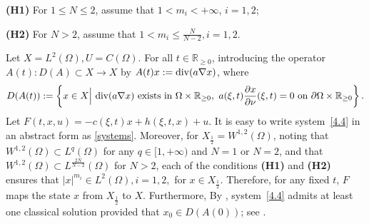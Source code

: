 \documentclass[onecolumn]{autart}
\newenvironment{proof of Prop.ODE}{{\it Proof of Proposition~\ref{Prop.ODE}:\enspace}}{\hfill $\blacksquare$\par}
\newenvironment{proof of PDE}{{\it Proof of Proposition \ref{Prop.8}:\enspace}}{\hfill $\blacksquare$\par}
\newtheorem{assumption}{Assumption}
\begin{document}
{%
\textbf{(H1)} For $1\leq N\leq 2$,  assume that $1<m_i<+\infty $,  $i=1,2$;

\textbf{(H2)} For $N>2$, assume that $ {1<m_i\leq \frac{N}{N-2}}, i=1, 2$.

Let $ X =L^{2}(\Omega),  U=C(\Omega)$. For all $t\in\mathbb{R}_{\geq 0}$, introducing the operator $A(t):D(A)\subset X \rightarrow X $ by $A(t)x:=  {\rm div}(a\nabla x)$, where
\begin{align*}
	D(A(t)):=\left\{x\in  X \Big|~{\rm div}(a\nabla x)\  \text{exists\ in}\ \Omega\times\mathbb{R}_{\geq 0}, \  a(\xi, t)\frac{\partial x }{\partial {\nu}}(\xi,t)  =0\ \text{on}\ \partial \Omega\times \mathbb{R}_{\geq 0}\right\}.
\end{align*}
{Let $F(t,x,u)=-c(\xi,t)x+h(\xi,t,x)+u$.
	It is easy to write   system~\eqref{4.4} in an abstract form as \eqref{systems}. Moreover, for $X_{\frac{1}{2}} =W^{1,2}(\Omega)$,  noting that    $W^{1,2}(\Omega)\subset L^{q}(\Omega)$  for any $q\in [1,+\infty)$ and $N=1$ or $N=2$, and that $W^{1,2}(\Omega)\subset L^{\frac{2N}{N-2}}(\Omega)$ for $N>2$,  each of the conditions \textbf{(H1)} and \textbf{(H2)} ensures that $|x|^{m_i}\in L^{2}(\Omega), i=1,2,$ for $x\in X_{\frac{1}{2}}$. Therefore,  for any fixed $t$, $F$ maps the state $x$ from $X_{\frac{1}{2}}$ to $X$.}
Furthermore, By \cite[Theorem 6.2 p.~457 and Theorem 7.4, p.~491]{Lady1968linear}, system~\eqref{4.4} admits at least one classical solution provided that $x_0\in D(A(0))$; see {\cite[\S 7, Chap. V]{Lady1968linear}}.
%
% 	
%
%
}
\end{document}
